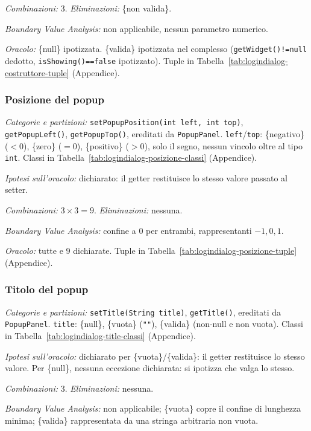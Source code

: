 \textit{Combinazioni:} $3$. \textit{Eliminazioni:} \{non valida\}.

\textit{Boundary Value Analysis:} non applicabile, nessun parametro numerico.

\textit{Oracolo:} \{null\} ipotizzata. \{valida\} ipotizzata nel complesso
(\texttt{getWidget()!=null} dedotto, \texttt{isShowing()==false} ipotizzato). Tuple in
Tabella~\ref{tab:logindialog-costruttore-tuple} (Appendice).

\subsubsection{Posizione del popup}

\textit{Categorie e partizioni:} \texttt{setPopupPosition(int left, int top)},
\texttt{getPopupLeft()}, \texttt{getPopupTop()}, ereditati da \texttt{PopupPanel}.
\texttt{left}/\texttt{top}: \{negativo\} ($<0$), \{zero\} ($=0$), \{positivo\} ($>0$), solo il
segno, nessun vincolo oltre al tipo \texttt{int}. Classi in
Tabella~\ref{tab:logindialog-posizione-classi} (Appendice).

\textit{Ipotesi sull'oracolo:} dichiarato: il getter restituisce lo stesso valore passato al
setter.

\textit{Combinazioni:} $3\times3=9$. \textit{Eliminazioni:} nessuna.

\textit{Boundary Value Analysis:} confine a $0$ per entrambi, rappresentanti $-1,0,1$.

\textit{Oracolo:} tutte e 9 dichiarate. Tuple in Tabella~\ref{tab:logindialog-posizione-tuple}
(Appendice).

\subsubsection{Titolo del popup}

\textit{Categorie e partizioni:} \texttt{setTitle(String title)}, \texttt{getTitle()},
ereditati da \texttt{PopupPanel}. \texttt{title}: \{null\}, \{vuota\} (\texttt{""}), \{valida\}
(non-null e non vuota). Classi in Tabella~\ref{tab:logindialog-title-classi} (Appendice).

\textit{Ipotesi sull'oracolo:} dichiarato per \{vuota\}/\{valida\}: il getter restituisce lo
stesso valore. Per \{null\}, nessuna eccezione dichiarata: si ipotizza che valga lo stesso.

\textit{Combinazioni:} $3$. \textit{Eliminazioni:} nessuna.

\textit{Boundary Value Analysis:} non applicabile; \{vuota\} copre il confine di lunghezza
minima; \{valida\} rappresentata da una stringa arbitraria non vuota.

